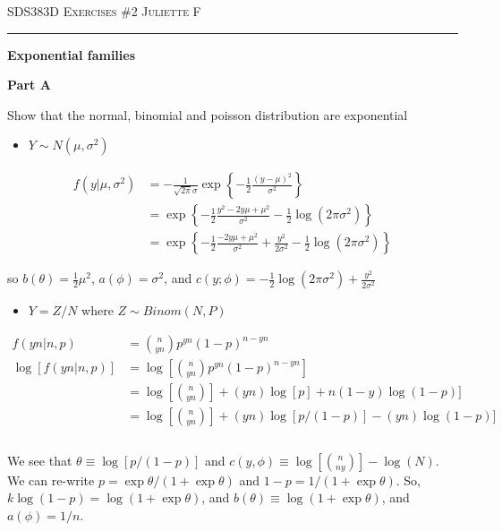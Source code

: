 \documentclass[12pt]{amsart}
\begin{document}
\thispagestyle{empty}

{\scshape SDS383D} \hfill {\scshape \Large Exercises \#2} \hfill {\scshape Juliette F}
 \medskip
\hrule
\bigskip
\bigskip

{\bf \large Exponential families} 
\bigskip



{\bf Part A} 
\bigskip

Show that the normal, binomial and poisson distribution are exponential

\begin{itemize}
    \item $Y \sim N(\mu, \sigma^2) $
\end{itemize}
\bigskip
\bigskip

\begin{align*}
f(y|\mu,\sigma^2)&= -\frac{1}{\sqrt{2\pi}\sigma} \exp \left\{ -\frac{1}{2} \frac{(y-\mu)^2}{\sigma^2}\right\}\\
&=\exp \left\{ -\frac{1}{2} \frac{y^2-2y\mu + \mu^2}{\sigma^2}  -\frac{1}{2}\log ( 2\pi\sigma^2)\right\} \\
&=  \exp \left\{ -\frac{1}{2} \frac{-2y\mu + \mu^2}{\sigma^2} + \frac{y^2}{2\sigma^2} -\frac{1}{2}\log ( 2\pi\sigma^2)\right\}
\end{align*}

\bigskip
\bigskip

so $b(\theta) = \frac{1}{2}\mu^2$, $a(\phi) = \sigma^2$, and $ c(y;\phi) =-\frac{1}{2}\log ( 2\pi\sigma^2) + \frac{y^2}{2\sigma^2} $

\bigskip
\bigskip


\begin{itemize}
    \item $Y=Z/N $ where $Z \sim Binom(N, P)$
\end{itemize}
\medskip


\begin{align*}
f(yn|n,p)&= {n \choose yn} p^{yn} (1-p)^{n-yn}\\
\log[f(yn|n,p)]&= \log[{n \choose yn} p^{yn} (1-p)^{n-yn}]\\
&=\log[{n \choose yn}]+(yn)\log[p] + n(1-y) \log(1-p)]\\
&=\log[{n \choose yn}]+(yn)\log[p/(1-p)] -(yn) \log(1-p)]\\
\end{align*}\\



We see that $\theta \equiv\log[p/(1-p)] $ and $c(y, \phi) \equiv \log[{n \choose ny}] - \log(N) $. We can re-write $p = \exp\theta/(1+\exp\theta)$ and $1-p = 1/(1+\exp\theta)$. So, $k \log(1-p) =  \log(1+\exp\theta)$, and $b(\theta) \equiv  \log(1+\exp\theta)$, and $a(\phi)=1/n $. 
\end{document}
